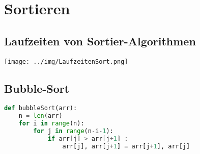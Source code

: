 \documentclass[german]{latex4ei/latex4ei_sheet}
\begin{document}
\section{Sortieren}

\begin{sectionbox}
\subsection{Laufzeiten von Sortier-Algorithmen}\smallskip
\begin{center}
    \texttt{[image: ../img/LaufzeitenSort.png]}
\end{center}
\end{sectionbox}

\begin{sectionbox}
\subsection{Bubble-Sort}
\begin{lstlisting}[language=Python]
def bubbleSort(arr): 
    n = len(arr) 
    for i in range(n):
        for j in range(n-i-1): 
            if arr[j] > arr[j+1] : 
                arr[j], arr[j+1] = arr[j+1], arr[j] 
\end{lstlisting}\vspace{-6px}
\end{sectionbox}
\end{document}
